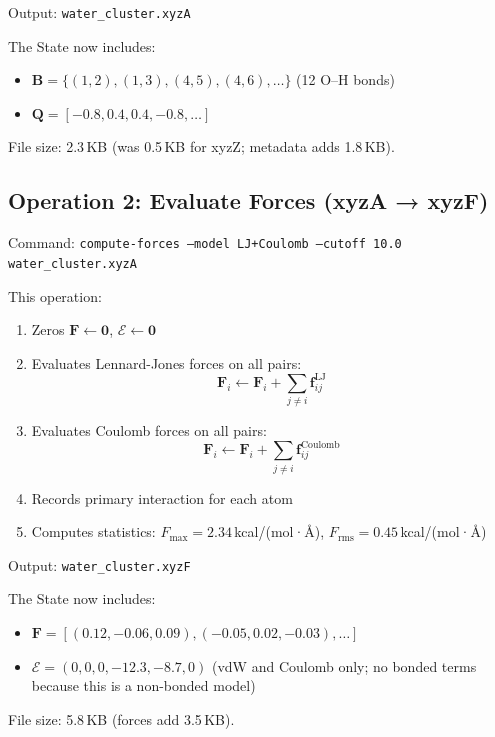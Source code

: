 \documentclass[11pt]{article}
\begin{document}
Output: \texttt{water\_cluster.xyzA}

The State now includes:
\begin{itemize}
\item $\mathbf{B} = \{(1,2), (1,3), (4,5), (4,6), \ldots\}$ (12 O–H bonds)
\item $\mathbf{Q} = [-0.8, 0.4, 0.4, -0.8, \ldots]$
\end{itemize}

File size: 2.3\,KB (was 0.5\,KB for xyzZ; metadata adds 1.8\,KB).

\subsection{Operation 2: Evaluate Forces (xyzA → xyzF)}

Command: \texttt{compute-forces --model LJ+Coulomb --cutoff 10.0 water\_cluster.xyzA}

This operation:
\begin{enumerate}
\item Zeros $\mathbf{F} \gets \mathbf{0}$, $\mathcal{E} \gets \mathbf{0}$
\item Evaluates Lennard-Jones forces on all pairs:
    \begin{equation}
    \mathbf{F}_i \gets \mathbf{F}_i + \sum_{j \neq i} \mathbf{f}_{ij}^{\text{LJ}}
    \end{equation}
\item Evaluates Coulomb forces on all pairs:
    \begin{equation}
    \mathbf{F}_i \gets \mathbf{F}_i + \sum_{j \neq i} \mathbf{f}_{ij}^{\text{Coulomb}}
    \end{equation}
\item Records primary interaction for each atom
\item Computes statistics: $F_{\max} = 2.34$\,kcal/(mol·\AA), $F_{\text{rms}} = 0.45$\,kcal/(mol·\AA)
\end{enumerate}

Output: \texttt{water\_cluster.xyzF}

The State now includes:
\begin{itemize}
\item $\mathbf{F} = [(0.12, -0.06, 0.09), (-0.05, 0.02, -0.03), \ldots]$
\item $\mathcal{E} = (0, 0, 0, -12.3, -8.7, 0)$ (vdW and Coulomb only; no bonded terms because this is a non-bonded model)
\end{itemize}

File size: 5.8\,KB (forces add 3.5\,KB).
\end{document}

